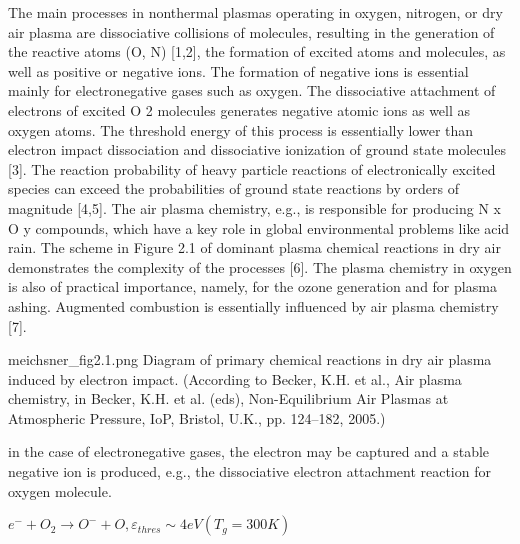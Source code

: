 The main processes in nonthermal plasmas operating in oxygen, nitrogen, or dry air
plasma are dissociative collisions of molecules, resulting in the generation of the
reactive atoms (O, N) [1,2], the formation of excited atoms and molecules, as well
as positive or negative ions. The formation of negative ions is essential mainly for
electronegative gases such as oxygen. The dissociative attachment of electrons of
excited O 2 molecules generates negative atomic ions as well as oxygen atoms. The
threshold energy of this process is essentially lower than electron impact dissociation
and dissociative ionization of ground state molecules [3]. The reaction probability of
heavy particle reactions of electronically excited species can exceed the probabilities
of ground state reactions by orders of magnitude [4,5].
The air plasma chemistry, e.g., is responsible for producing N x O y compounds,
which have a key role in global environmental problems like acid rain. The scheme
in Figure 2.1 of dominant plasma chemical reactions in dry air demonstrates the
complexity of the processes [6].
The plasma chemistry in oxygen is also of practical importance, namely, for
the ozone generation and for plasma ashing. Augmented combustion is essentially
influenced by air plasma chemistry [7].

meichsner_fig2.1.png
Diagram of primary chemical reactions in dry air plasma induced by electron
impact. (According to Becker, K.H. et al., Air plasma chemistry, in Becker, K.H. et al. (eds),
Non-Equilibrium Air Plasmas at Atmospheric Pressure, IoP, Bristol, U.K., pp. 124–182, 2005.)


in the case of electronegative gases, the electron may be captured and
a stable negative ion is produced, e.g., the dissociative electron attachment reaction
for oxygen molecule.

$e^− + O_2 \rightarrow O^− + O, \varepsilon_{thres} ∼ 4 eV (T_g = 300 K)$
